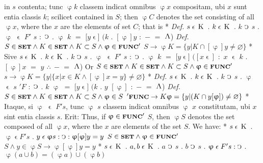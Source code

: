 \documentclass{book}
\newcommand{\C}{\mathop{\sbox0{$\displaystyle$$\reflectbox{C}$} %
\raisebox{-\height+\ht0-0.05cm}[\ht0][\dp0]{\scalebox{0.8}[0.8]{\copy0}}}\displaylimits} %
\newcommand{\pppNoSpace}{\leavevmode\lower0ex\hbox{.}\kern-0.1em\raise0.7ex\hbox{.}\kern-0.1em\lower0ex\hbox{.}} %
\newcommand{\abs}{\mathop{\rotatebox[origin=c]{180}{V}}}
\newcommand{\smallIn}{\ensuremath{\mathrel{\epsilon}}}
\newcommand{\K}{\mathop{\thinspace \text{K} \thinspace}}
\newcommand{\setOfSets}{\mathord{\text{{\footnotesize \textbf{SET}}}}}
\newcommand{\func}{\mathord{\text{{\footnotesize \textbf{FUNC}}}}}
\newenvironment{translateTwoCol}
               { %
                 \columnratio{0.5, 0.5}
                 \begin{paracol}{2}
                 \newcommand{\LAT}{\switchcolumn[0]*}
                 \newcommand{\ENG}{\switchcolumn[1]}
               }
               { %
                 \let\ENG\undefined
                 \let\LAT\undefined
                 \end{paracol}
               }
\begin{document}
\begin{translateTwoCol}
in $s$ contenta; tunc $\upvarphi k$ classem indicat omnibus $\upvarphi x$ compositam, ubi $x$ sunt entia classis $k$; scilicet
\ENG
contained in $S$; then $\upvarphi C$ denotes the set consisting of all $\upvarphi x$, where the $x$ are the elements of set $C$; that is
\LAT
\emph{Def.} \hspace{0.25cm} $s \smallIn \K$ $.$ $k \smallIn \K$ $.$ $k$ $\C$ $s$ $.$ $\upvarphi$ $\smallIn$ $F'$ $s$ $:$ $\C$ $.$ $\upvarphi$ $k$ $=$ $[y $\smallIn$]$ $(k$ $.$ $[\upvarphi]y$ $:$ $-$ $=$ $\abs$)
\ENG
\emph{Def.} \hspace{0.25cm} $S \in \setOfSets \wedge K \in \setOfSets \wedge K \subset S \wedge \upvarphi \in \func'$ $S \rightarrow \upvarphi K = \{ y | K \cap [\upvarphi]y \neq \varnothing \}$
\LAT
Sive \hspace{0.25cm} $s \smallIn \K$ $.$ $k \smallIn \K$ $.$ $k$ $\C$ $s$ $.$ $\upvarphi$ $\smallIn$ $F'$ $s$ $:$ $\C$ $.$ $\upvarphi$ $k$ $=$ $[y $\smallIn$]$ $([x\smallIn]$ $:$ $x$ $\smallIn$ $k$ $.$ $[\upvarphi]x$ $=$ $y$ $\pppNoSpace$ $-$ $=$ $\abs$)
\ENG
Or \hspace{0.25cm} $S \in \setOfSets \wedge K \in \setOfSets \wedge K \subset S \wedge \upvarphi \in \func'$ $s \rightarrow \upvarphi K = \{ y | \{ x | x \in K \wedge [\upvarphi]x = y \} \neq \varnothing \}$
\LAT
\emph{Def.} \hspace{0.25cm} $s \smallIn \K$ $.$ $k \smallIn \K$ $.$ $k$ $\C$ $s$ $.$ $\upvarphi$ $\smallIn$ $s$ $'F$ $:$ $\C$ $.$ $k$ $\upvarphi$ $=$ $[y $\smallIn$]$ $(k$ $.$ $y$ $[\upvarphi]$ $:$ $-$ $=$ $\abs$)
\ENG
\emph{Def.} \hspace{0.25cm} $S \in \setOfSets \wedge K \in \setOfSets \wedge K \subset S \wedge \upvarphi \in S$ $'\func \rightarrow K \upvarphi = \{ y | (K \cap y [\upvarphi]) \neq \varnothing \}$
\LAT
Itaque, si $\upvarphi$ $\smallIn$ $F' s$, tunc $\upvarphi$ $s$ classem indicat omnibus $\upvarphi$ $x$ constitutam, ubi $x$ sint entia classis $s$. Erit:
\ENG
Thus, if $\upvarphi \in \func'$ $S$, then $\upvarphi S$ denotes the set composed of all $\upvarphi x$, where the $x$ are elements of the set $S$. We have:
\LAT
\hspace{1.06cm} $s \smallIn \K$ . $\upvarphi \smallIn F' s$ . $y \smallIn \upvarphi s : \C : \upvarphi [\upvarphi] y = y$
\ENG
\hspace{1.06cm} $S \in \setOfSets \wedge \upvarphi \in \func'$ $S \wedge y \in \upvarphi S \rightarrow \upvarphi [\upvarphi] y = y$
\LAT
\hspace{1.06cm} $s \smallIn \K$ . $a, b \smallIn \K$ . $a$ $\C$ $s$ . $b$ $\C$ $s$ . $\upvarphi \smallIn F' s : \C$ . $\upvarphi (a \cup b) = (\upvarphi a) \cup (\upvarphi b)$

\end{translateTwoCol}
\end{document}
